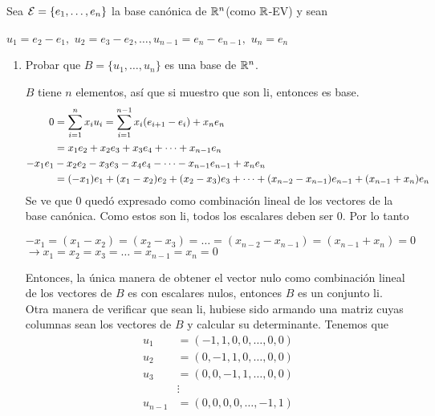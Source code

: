 \item Sea $\mathcal{E}=\{e_1,\dots,e_n\}$ la base canónica de $\mathbb{R}^n$(como $\mathbb{R}$-EV) y sean
    \begin{center}
        $u_1=e_2-e_1,$ $ u_2=e_3-e_2,\dots,u_{n-1}=e_n-e_{n-1},$ $u_n=e_n$ 
    \end{center}
    \begin{enumerate}
        \item Probar que $B=\{u_1,\dots,u_n\}$ es una base de $\mathbb{R}^n$.
            \begin{mdframed}[style=s]
                $B$ tiene $n$ elementos, así que si muestro que son li, entonces es base.
                \begin{align*}
                    0&=\displaystyle\sum_{i=1}^nx_iu_i=\displaystyle\sum_{i=1}^{n-1}x_i(e_{i+1}-e_i)+x_ne_n\\
                    &=x_1e_2+x_2e_3+x_3e_4+\dots+x_{n-1}e_n\\
                    -x_1e_1&-x_2e_2-x_3e_3-x_4e_4-\dots-x_{n-1}e_{n-1}+x_ne_n\\
                    &=(-x_1)e_1+(x_1-x_2)e_2+(x_2-x_3)e_3+\dots+(x_{n-2}-x_{n-1})e_{n-1}+(x_{n-1}+x_n)e_n
                \end{align*}
                Se ve que $0$ quedó expresado como combinación lineal de los vectores de la base canónica. Como estos son li, todos los escalares deben ser $0$. Por lo tanto
                \begin{center}
                    $-x_1=(x_1-x_2)=(x_2-x_3)=\dots=(x_{n-2}-x_{n-1})=(x_{n-1}+x_n)=0$\\
                    $\to x_1=x_2=x_3=\dots=x_{n-1}=x_n=0$
                \end{center}
                Entonces, la única manera de obtener el vector nulo como combinación lineal de los vectores de $B$ es con escalares nulos, entonces $B$ es un conjunto li.\vspace{6pt}\\
                Otra manera de verificar que sean li, hubiese sido armando una matriz cuyas columnas sean los vectores de $B$ y calcular su determinante. Tenemos que
                \begin{align*}
                    u_1&=(-1,1,0,0,\dots,0,0)\\
                    u_2&=(0,-1,1,0,\dots,0,0)\\
                    u_3&=(0,0,-1,1,\dots,0,0)\\
                    &\vdots\\
                    u_{n-1}&=(0,0,0,0,\dots,-1,1)\\

\end{align*}
\end{mdframed}
\end{enumerate}
